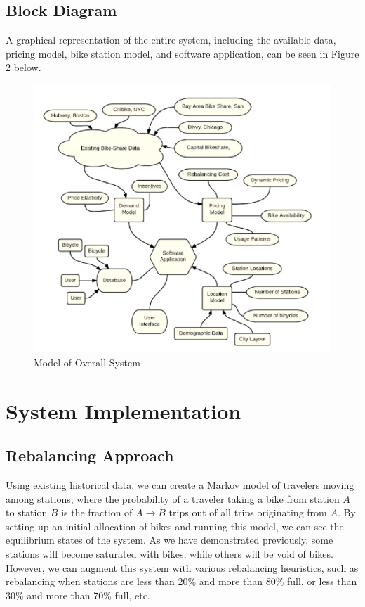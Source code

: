 \documentclass{sig-alternate}
\begin{document}
\subsection{Block Diagram}
A graphical representation of the entire system, including the available data, pricing model, bike station model, and software application, can be seen in Figure 2 below.


\begin{figure}[htb!]	\begin{center}
		\includegraphics[width=1.0\linewidth]{model}
	\end{center}
	\vspace{-12pt}
	\caption{Model of Overall System}
	\label{fig:heatmap}
\end{figure}

\section{System Implementation}
\subsection{Rebalancing Approach}
Using existing historical data, we can create a Markov model of travelers moving among stations, where the probability of a traveler taking a bike from station $A$ to station $B$ is the fraction of $A \rightarrow B$ trips out of all trips originating from $A$.  By setting up an initial allocation of bikes and running this model, we can see the equilibrium states of the system.  As we have demonstrated previously, some stations will become saturated with bikes, while others will be void of bikes.  However, we can augment this system with various rebalancing heuristics, such as rebalancing when stations are less than 20\% and more than 80\% full, or less than 30\% and more than 70\% full, etc. \newline
\end{document}
